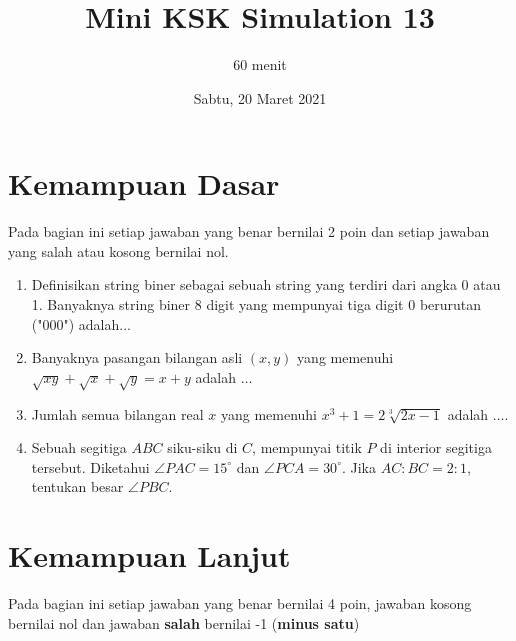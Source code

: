 \documentclass[12pt]{scrartcl}
\title{Mini KSK Simulation 13}
\author{60 menit}
\date{Sabtu, 20 Maret 2021}
\begin{document}
	\maketitle

\renewcommand*\contentsname{Daftar Isi}
\tableofcontents

\newpage
	
	\section{Kemampuan Dasar}
	Pada bagian ini setiap jawaban yang benar bernilai 2 poin dan setiap jawaban yang salah
	atau kosong bernilai nol.
	\begin{enumerate}
		\item Definisikan string biner sebagai sebuah string yang terdiri dari angka 0 atau 1. Banyaknya string biner 8 digit yang mempunyai tiga digit 0 berurutan ("000") adalah...
		
		\item Banyaknya pasangan bilangan asli $(x,y)$ yang memenuhi $\sqrt{xy}+\sqrt{x}+\sqrt{y}= x+y$ adalah $\dots$
		
		\item Jumlah semua bilangan real $x$ yang memenuhi $x^3+1=2\sqrt[3]{2x-1}$ adalah $\dots$.
		
		\item Sebuah segitiga $ABC$ siku-siku di $C$, mempunyai titik $P$ di interior segitiga tersebut. Diketahui $\angle PAC = 15^\circ$ dan $\angle PCA = 30^\circ$. Jika $AC:BC = 2:1$, tentukan besar $\angle PBC$.
	\end{enumerate}

\section{Kemampuan Lanjut}
Pada bagian ini setiap jawaban yang benar bernilai 4 poin, jawaban kosong bernilai nol
dan jawaban \textbf{salah} bernilai -1 (\textbf{minus satu})
\end{document}
